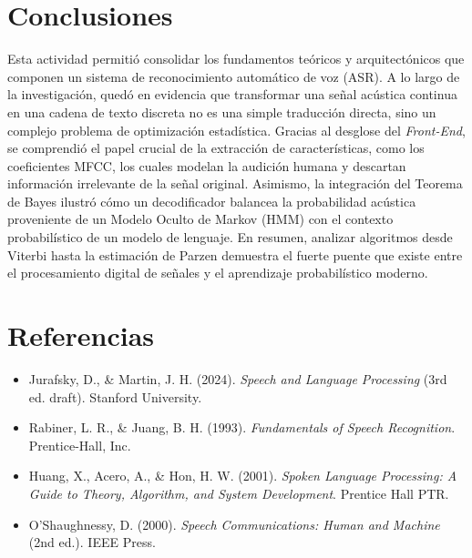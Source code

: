 \documentclass[12pt]{article}
\begin{document}
	\section{Conclusiones}
	Esta actividad permitió consolidar los fundamentos teóricos y arquitectónicos que componen un sistema de reconocimiento automático de voz (ASR). A lo largo de la investigación, quedó en evidencia que transformar una señal acústica continua en una cadena de texto discreta no es una simple traducción directa, sino un complejo problema de optimización estadística. Gracias al desglose del \textit{Front-End}, se comprendió el papel crucial de la extracción de características, como los coeficientes MFCC, los cuales modelan la audición humana y descartan información irrelevante de la señal original. Asimismo, la integración del Teorema de Bayes ilustró cómo un decodificador balancea la probabilidad acústica proveniente de un Modelo Oculto de Markov (HMM) con el contexto probabilístico de un modelo de lenguaje. En resumen, analizar algoritmos desde Viterbi hasta la estimación de Parzen demuestra el fuerte puente que existe entre el procesamiento digital de señales y el aprendizaje probabilístico moderno.
	
	\newpage
	\section{Referencias}
	\begin{itemize}
		\item Jurafsky, D., \& Martin, J. H. (2024). \textit{Speech and Language Processing} (3rd ed. draft). Stanford University.
		\item Rabiner, L. R., \& Juang, B. H. (1993). \textit{Fundamentals of Speech Recognition}. Prentice-Hall, Inc.
		\item Huang, X., Acero, A., \& Hon, H. W. (2001). \textit{Spoken Language Processing: A Guide to Theory, Algorithm, and System Development}. Prentice Hall PTR.
		\item O'Shaughnessy, D. (2000). \textit{Speech Communications: Human and Machine} (2nd ed.). IEEE Press.
	\end{itemize}
\end{document}
